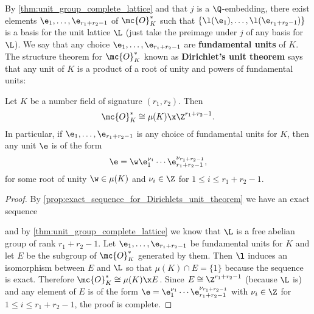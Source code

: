     By \cref{thm:unit_group_complete_lattice} and that $j$ is a $\Q$-embedding, there exist elements $\e_{1},\ldots,\e_{r_{1}+r_{2}-1}$ of $\mc{O}_{K}^{\ast}$ such that $\{\l(\e_{1}),\ldots,\l(\e_{r_{1}+r_{2}-1})\}$ is a basis for the unit lattice $\L$ (just take the preimage under $j$ of any basis for $\L$). We say that any choice $\e_{1},\ldots,\e_{r_{1}+r_{2}-1}$ are \textbf{fundamental units} of $K$. The structure theorem for $\mc{O}_{K}^{\ast}$ known as \textbf{Dirichlet's unit theorem} says that any unit of $K$ is a product of a root of unity and powers of fundamental units:

    \begin{theorem}
      Let $K$ be a number field of signature $(r_{1},r_{2})$. Then
      \[
        \mc{O}_{K}^{\ast} \cong \mu(K) \x \Z^{r_{1}+r_{2}-1}.
      \]
      In particular, if $\e_{1},\ldots,\e_{r_{1}+r_{2}-1}$ is any choice of fundamental units for $K$, then any unit $\e$ is of the form
      \[
        \e = \w\e_{1}^{\nu_{1}} \cdots \e_{r_{1}+r_{2}-1}^{\nu_{r_{1}+r_{2}-1}},
      \]
      for some root of unity $\w \in \mu(K)$ and $\nu_{i} \in \Z$ for $1 \le i \le r_{1}+r_{2}-1$.
    \end{theorem}
    \begin{proof}
      By \cref{prop:exact_sequence_for_Dirichlets_unit_theorem} we have an exact sequence

      \begin{center}
      \end{center}

      and by \cref{thm:unit_group_complete_lattice} we know that $\L$ is a free abelian group of rank $r_{1}+r_{2}-1$. Let $\e_{1},\ldots,\e_{r_{1}+r_{2}-1}$ be fundamental units for $K$ and let $E$ be the subgroup of $\mc{O}_{K}^{\ast}$ generated by them. Then $\l$ induces an isomorphism between $E$ and $\L$ so that $\mu(K) \cap E = \{1\}$ because the sequence is exact. Therefore $\mc{O}_{K}^{\ast} \cong \mu(K) \x E$. Since $E \cong \Z^{r_{1}+r_{2}-1}$ (because $\L$ is) and any element of $E$ is of the form $\e = \e_{1}^{\nu_{1}} \cdots \e_{r_{1}+r_{2}-1}^{\nu_{r_{1}+r_{2}-1}}$ with $\nu_{i} \in \Z$ for $1 \le i \le r_{1}+r_{2}-1$, the proof is complete.
    \end{proof}
